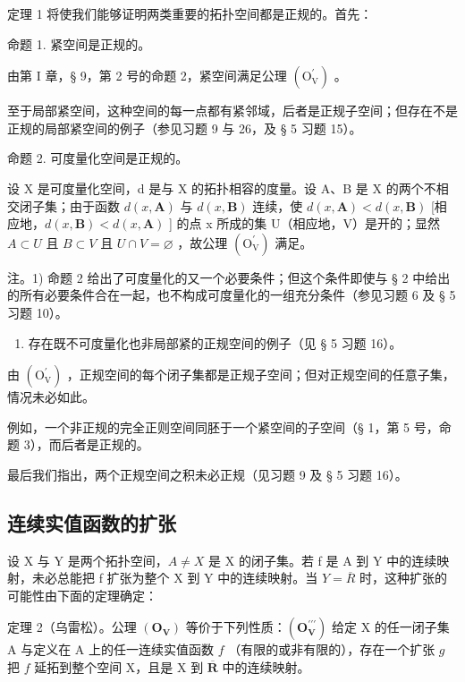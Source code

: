 定理 1 将使我们能够证明两类重要的拓扑空间都是正规的。首先：

命题 1. 紧空间是正规的。

由第 I 章，§ 9，第 2 号的命题 2，紧空间满足公理 \((\mathrm{O}_{\mathrm{V}}^{\prime})\) 。

至于局部紧空间，这种空间的每一点都有紧邻域，后者是正规子空间；但存在不是正规的局部紧空间的例子（参见习题 9 与 26，及 § 5 习题 15）。

命题 2. 可度量化空间是正规的。

设 X 是可度量化空间，d 是与 X 的拓扑相容的度量。设 A、B 是 X 的两个不相交闭子集；由于函数 \(d(x, \mathbf{A})\) 与 \(d(x, \mathbf{B})\) 连续，使 \(d(x, \mathbf{A}) < d(x, \mathbf{B})\) {[}相应地，\(d(x, \mathbf{B}) < d(x, \mathbf{A})\) {]} 的点 x 所成的集 U（相应地，V）是开的；显然 \(A \subset U\) 且 \(B \subset V\) 且 \(U \cap V = \varnothing\) ，故公理 \((\mathrm{O}_{\mathrm{V}}^{\prime})\) 满足。

注。1) 命题 2 给出了可度量化的又一个必要条件；但这个条件即使与 § 2 中给出的所有必要条件合在一起，也不构成可度量化的一组充分条件（参见习题 6 及 § 5 习题 10）。

\begin{enumerate}
\def\labelenumi{\arabic{enumi})}
\setcounter{enumi}{1}
\tightlist
\item
  存在既不可度量化也非局部紧的正规空间的例子（见 § 5 习题 16）。
\end{enumerate}

由 \((\mathrm{O}_{\mathrm{V}}^{\prime})\) ，正规空间的每个闭子集都是正规子空间；但对正规空间的任意子集，情况未必如此。

例如，一个非正规的完全正则空间同胚于一个紧空间的子空间（§ 1，第 5 号，命题 3），而后者是正规的。

最后我们指出，两个正规空间之积未必正规（见习题 9 及 § 5 习题 16）。

\subsection{连续实值函数的扩张}

设 X 与 Y 是两个拓扑空间，\(A \neq X\) 是 X 的闭子集。若 f 是 A 到 Y 中的连续映射，未必总能把 f 扩张为整个 X 到 Y 中的连续映射。当 \(Y = \overline{R}\) 时，这种扩张的可能性由下面的定理确定：

定理 2（乌雷松）。公理 \((\mathbf{O}_{\mathbf{V}})\) 等价于下列性质：\((\mathbf{O}_{\mathbf{V}}^{\prime \prime \prime})\) 给定 X 的任一闭子集 A 与定义在 A 上的任一连续实值函数 \(f\) （有限的或非有限的），存在一个扩张 \(g\) 把 \(f\) 延拓到整个空间 X，且是 X 到 \(\overline{\mathbf{R}}\) 中的连续映射。

